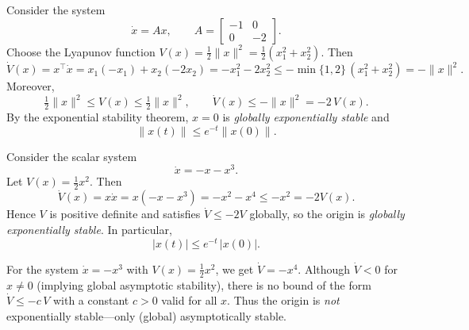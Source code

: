 \begin{example}
Consider the system
\begin{equation}
    \dot{x} = Ax,\qquad A=\begin{bmatrix}-1 & 0\\ 0 & -2\end{bmatrix}.
\end{equation}
Choose the Lyapunov function $V(x)=\tfrac{1}{2}\|x\|^2=\tfrac{1}{2}(x_1^2+x_2^2)$. Then
\begin{equation}
    \dot{V}(x) = x^\top \dot{x} = x_1(-x_1)+x_2(-2x_2) = -x_1^2-2x_2^2
    \le -\min\{1,2\}\,(x_1^2+x_2^2) = -\|x\|^2.
\end{equation}
Moreover,
\begin{equation}
    \tfrac{1}{2}\|x\|^2 \le V(x) \le \tfrac{1}{2}\|x\|^2, 
    \qquad \dot{V}(x) \le -\|x\|^2 = -2\,V(x).
\end{equation}
By the exponential stability theorem, $x=0$ is \emph{globally exponentially stable} and
\begin{equation}
    \|x(t)\| \le e^{-t}\|x(0)\|.
\end{equation}
\end{example}

\begin{example}
Consider the scalar system
\begin{equation}
    \dot{x} = -x - x^3.
\end{equation}
Let $V(x)=\tfrac{1}{2}x^2$. Then
\begin{equation}
    \dot{V}(x) = x\dot{x} = x(-x-x^3) = -x^2 - x^4 \le -x^2 = -2V(x).
\end{equation}
Hence $V$ is positive definite and satisfies $\dot{V}\le -2V$ globally, so the origin is
\emph{globally exponentially stable}. In particular,
\begin{equation}
    |x(t)| \le e^{-t}\,|x(0)|.
\end{equation}
\end{example}

\begin{remark}
For the system $\dot{x}=-x^3$ with $V(x)=\tfrac{1}{2}x^2$, we get $\dot{V}=-x^4$.
Although $\dot{V}<0$ for $x\neq 0$ (implying global asymptotic stability), there is no bound of the form
$\dot{V}\le -c\,V$ with a constant $c>0$ valid for all $x$. Thus the origin is \emph{not} exponentially
stable—only (global) asymptotically stable.
\end{remark}

